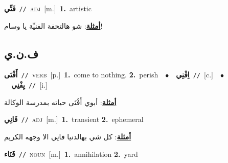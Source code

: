 \documentclass[10pt,a4paper,twoside]{article} %
\begin{document}
\begin{multicols}{2}
{\setlength\topsep{0pt}\textbf{\foreignlanguage{arabic}{فَنِّي}}\ {\color{gray}\texttt{//}\color{black}}\ \textsc{adj}\ [m.]\ \textbf{1.}~artistic\  \begin{flushright}\color{gray}\foreignlanguage{arabic}{\textbf{\underline{\foreignlanguage{arabic}{أمثلة}}}: شو هالتحفة الفنيِّة يا وسام!}\end{flushright}\color{black}} \vspace{2mm}

\vspace{-3mm}
\subsection*{\color{blue}\foreignlanguage{arabic}{ف.ن.ي}\color{blue}{}} 

{\setlength\topsep{0pt}\textbf{\foreignlanguage{arabic}{أَفْنَى}}\ {\color{gray}\texttt{//}\color{black}}\ \textsc{verb}\ [p.]\ \textbf{1.}~come to nothing.  \textbf{2.}~perish\ \ $\bullet$\ \ \setlength\topsep{0pt}\textbf{\foreignlanguage{arabic}{اِفْنِي}}\ {\color{gray}\texttt{//}\color{black}}\ [c.]\ \ $\bullet$\ \ \setlength\topsep{0pt}\textbf{\foreignlanguage{arabic}{يِفْنِي}}\ {\color{gray}\texttt{//}\color{black}}\ [i.]\  \begin{flushright}\color{gray}\foreignlanguage{arabic}{\textbf{\underline{\foreignlanguage{arabic}{أمثلة}}}: أبوي أَفْنَى حياته بمدرسة الوكالة}\end{flushright}\color{black}} \vspace{2mm}

{\setlength\topsep{0pt}\textbf{\foreignlanguage{arabic}{فَانِي}}\ {\color{gray}\texttt{//}\color{black}}\ \textsc{adj}\ [m.]\ \textbf{1.}~transient  \textbf{2.}~ephemeral\  \begin{flushright}\color{gray}\foreignlanguage{arabic}{\textbf{\underline{\foreignlanguage{arabic}{أمثلة}}}: كل شي بهالدنيا فانِي الا وجهه الكريم}\end{flushright}\color{black}} \vspace{2mm}

{\setlength\topsep{0pt}\textbf{\foreignlanguage{arabic}{فَنَاء}}\ {\color{gray}\texttt{//}\color{black}}\ \textsc{noun}\ [m.]\ \textbf{1.}~annihilation  \textbf{2.}~yard\ } \vspace{2mm}


\end{multicols}
\end{document}
